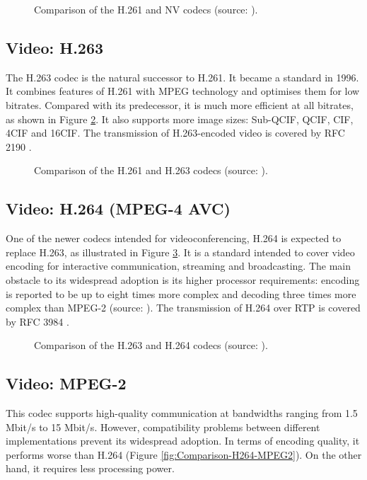 \begin{figure}[htp]
\centering

\caption{Comparison of the H.261 and NV codecs (source: \protect\cite{Comparison-H261-NV}).}
\label{fig:Comparison-H261-NV}
\end{figure}

\subsection{Video: H.263}\label{kap:H.263}
The H.263 codec is the natural successor to H.261. It became a standard in 1996. It combines features of H.261 with MPEG technology and optimises them for low bitrates. Compared with its predecessor, it is much more efficient at all bitrates, as shown in Figure \ref{fig:Comparison-H263-H261}. It also supports more image sizes: Sub-QCIF, QCIF, CIF, 4CIF and 16CIF. The transmission of H.263-encoded video is covered by RFC 2190 \cite{RFC-2190-RTP-Payload-Format-H.263}.

\begin{figure}[htp]
\centering

\caption{Comparison of the H.261 and H.263 codecs (source: \protect\cite{Comparison-H263-H261}).}
\label{fig:Comparison-H263-H261}
\end{figure}

\subsection{Video: H.264 (MPEG-4 AVC)}\label{kap:H.264}
One of the newer codecs intended for videoconferencing, H.264 is expected to replace H.263, as illustrated in Figure \ref{fig:Comparison-H264-H263}. It is a standard intended to cover video encoding for interactive communication, streaming and broadcasting. The main obstacle to its widespread adoption is its higher processor requirements: encoding is reported to be up to eight times more complex and decoding three times more complex than MPEG-2 (source: \cite{Latency-H264}). The transmission of H.264 over RTP is covered by RFC 3984 \cite{RFC-3984-RTP-Payload-Format-H.264}.

\begin{figure}[htp]
\centering

\caption{Comparison of the H.263 and H.264 codecs (source: \protect\cite{Comparison-H264-H263-MPEG2}).}
\label{fig:Comparison-H264-H263}
\end{figure}

\subsection{Video: MPEG-2}
This codec supports high-quality communication at bandwidths ranging from 1.5 Mbit/s to 15 Mbit/s. However, compatibility problems between different implementations prevent its widespread adoption. In terms of encoding quality, it performs worse than H.264 (Figure \ref{fig:Comparison-H264-MPEG2}). On the other hand, it requires less processing power.

